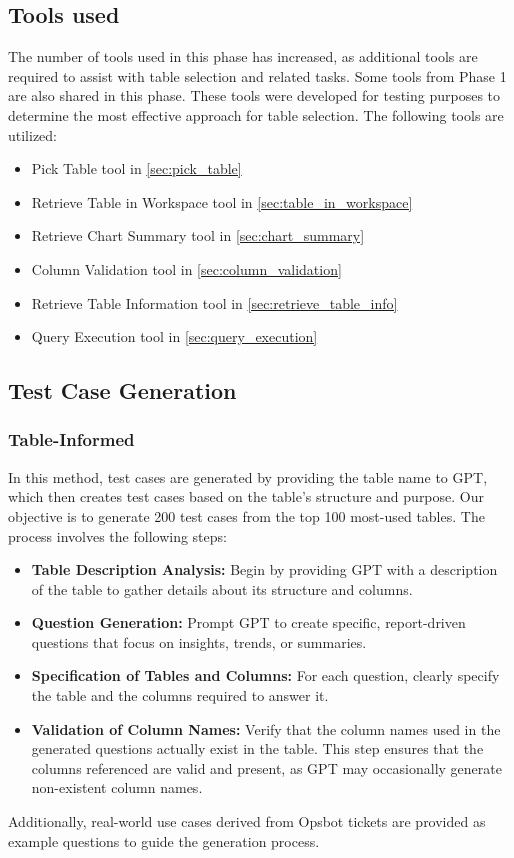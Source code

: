     \subsection{Tools used}
    The number of tools used in this phase has increased, as additional tools are required to assist with table selection and related tasks. Some tools from Phase 1 are also shared in this phase. These tools were developed for testing purposes to determine the most effective approach for table selection.
    The following tools are utilized:

    \begin{itemize}
        \item Pick Table tool in \ref{sec:pick_table}
        \item Retrieve Table in Workspace tool in \ref{sec:table_in_workspace}
        \item Retrieve Chart Summary tool in \ref{sec:chart_summary}
        \item Column Validation tool in \ref{sec:column_validation}
        \item Retrieve Table Information tool in \ref{sec:retrieve_table_info}
        \item Query Execution tool in \ref{sec:query_execution}
    \end{itemize}
    \subsection{Test Case Generation}
        \subsubsection{Table-Informed}
        In this method, test cases are generated by providing the table name to GPT, which then creates test cases based on the table's structure and purpose. Our objective is to generate 200 test cases from the top 100 most-used tables. The process involves the following steps:
        \begin{itemize}
            \item \textbf{Table Description Analysis:} Begin by providing GPT with a description of the table to gather details about its structure and columns.
            \item \textbf{Question Generation:} Prompt GPT to create specific, report-driven questions that focus on insights, trends, or summaries.
            \item \textbf{Specification of Tables and Columns:} For each question, clearly specify the table and the columns required to answer it.
            \item \textbf{Validation of Column Names:} Verify that the column names used in the generated questions actually exist in the table. This step ensures that the columns referenced are valid and present, as GPT may occasionally generate non-existent column names.
        \end{itemize}
        Additionally, real-world use cases derived from Opsbot tickets are provided as example questions to guide the generation process.

